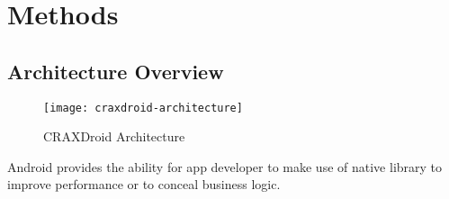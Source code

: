 \chapter{Methods}

\section{Architecture Overview}

\begin{figure}[!ht]
  \texttt{[image: craxdroid-architecture]}
  \caption{CRAXDroid Architecture}
  \label{fig:craxdroid-architecture}
\end{figure}

Android provides the ability for app developer to make use of native library
to improve performance or to conceal business logic.
